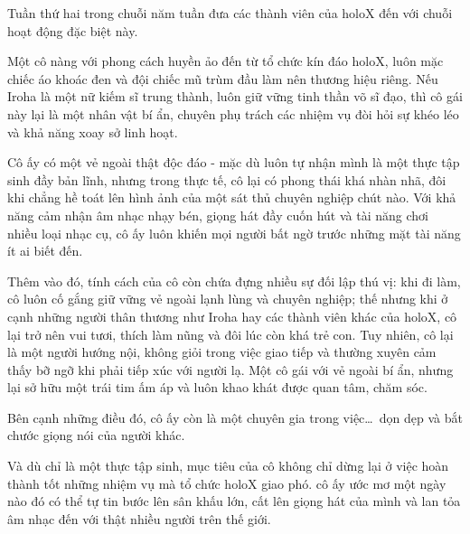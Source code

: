 \documentclass[../main.tex]{subfiles}
\begin{document}
\color{black}



Tuần thứ hai trong chuỗi năm tuần đưa các thành viên của holoX đến với chuỗi hoạt động đặc biệt này.

Một cô nàng với phong cách huyền ảo đến từ tổ chức kín đáo holoX, luôn mặc chiếc áo khoác đen và đội chiếc mũ trùm đầu làm nên thương hiệu riêng. Nếu Iroha là một nữ kiếm sĩ trung thành, luôn giữ vững tinh thần võ sĩ đạo, thì cô gái này lại là một nhân vật bí ẩn, chuyên phụ trách các nhiệm vụ đòi hỏi sự khéo léo và khả năng xoay sở linh hoạt.

Cô ấy có một vẻ ngoài thật độc đáo - mặc dù luôn tự nhận mình là một thực tập sinh đầy bản lĩnh, nhưng trong thực tế, cô lại có phong thái khá nhàn nhã, đôi khi chẳng hề toát lên hình ảnh của một sát thủ chuyên nghiệp chút nào. Với khả năng cảm nhận âm nhạc nhạy bén, giọng hát đầy cuốn hút và tài năng chơi nhiều loại nhạc cụ, cô ấy luôn khiến mọi người bất ngờ trước những mặt tài năng ít ai biết đến.

Thêm vào đó, tính cách của cô còn chứa đựng nhiều sự đối lập thú vị: khi đi làm, cô luôn cố gắng giữ vững vẻ ngoài lạnh lùng và chuyên nghiệp; thế nhưng khi ở cạnh những người thân thương như Iroha hay các thành viên khác của holoX, cô lại trở nên vui tươi, thích làm nũng và đôi lúc còn khá trẻ con. Tuy nhiên, cô lại là một người hướng nội, không giỏi trong việc giao tiếp và thường xuyên cảm thấy bỡ ngỡ khi phải tiếp xúc với người lạ. Một cô gái với vẻ ngoài bí ẩn, nhưng lại sở hữu một trái tim ấm áp và luôn khao khát được quan tâm, chăm sóc.

Bên cạnh những điều đó, cô ấy còn là một chuyên gia trong việc\dots\ dọn dẹp và bắt chước giọng nói của người khác.

Và dù chỉ là một thực tập sinh, mục tiêu của cô không chỉ dừng lại ở việc hoàn thành tốt những nhiệm vụ mà tổ chức holoX giao phó. cô ấy ước mơ một ngày nào đó có thể tự tin bước lên sân khấu lớn, cất lên giọng hát của mình và lan tỏa âm nhạc đến với thật nhiều người trên thế giới.
\end{document}
